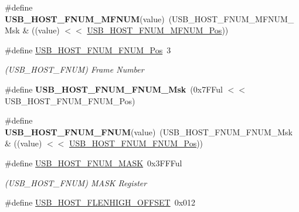 \begin{DoxyCompactItemize}
\item 
\hypertarget{group___s_a_m_l21___u_s_b_ga5c9a91c7aecde239f78f2855b092052f}{}\#define {\bfseries U\+S\+B\+\_\+\+H\+O\+S\+T\+\_\+\+F\+N\+U\+M\+\_\+\+M\+F\+N\+U\+M}(value)~(U\+S\+B\+\_\+\+H\+O\+S\+T\+\_\+\+F\+N\+U\+M\+\_\+\+M\+F\+N\+U\+M\+\_\+\+Msk \& ((value) $<$$<$ \hyperlink{group___s_a_m_l21___u_s_b_ga4f0798badf86adfa80aede8433e5cce4}{U\+S\+B\+\_\+\+H\+O\+S\+T\+\_\+\+F\+N\+U\+M\+\_\+\+M\+F\+N\+U\+M\+\_\+\+Pos}))\label{group___s_a_m_l21___u_s_b_ga5c9a91c7aecde239f78f2855b092052f}

\item 
\hypertarget{group___s_a_m_l21___u_s_b_ga7fccb7a92df0639adc1b73dad6e17d87}{}\#define \hyperlink{group___s_a_m_l21___u_s_b_ga7fccb7a92df0639adc1b73dad6e17d87}{U\+S\+B\+\_\+\+H\+O\+S\+T\+\_\+\+F\+N\+U\+M\+\_\+\+F\+N\+U\+M\+\_\+\+Pos}~3\label{group___s_a_m_l21___u_s_b_ga7fccb7a92df0639adc1b73dad6e17d87}

\begin{DoxyCompactList}\small\item\em (U\+S\+B\+\_\+\+H\+O\+S\+T\+\_\+\+F\+N\+U\+M) Frame Number \end{DoxyCompactList}\item 
\hypertarget{group___s_a_m_l21___u_s_b_gaeba1cea267102daedd3d1d3ca046230a}{}\#define {\bfseries U\+S\+B\+\_\+\+H\+O\+S\+T\+\_\+\+F\+N\+U\+M\+\_\+\+F\+N\+U\+M\+\_\+\+Msk}~(0x7\+F\+Ful $<$$<$ U\+S\+B\+\_\+\+H\+O\+S\+T\+\_\+\+F\+N\+U\+M\+\_\+\+F\+N\+U\+M\+\_\+\+Pos)\label{group___s_a_m_l21___u_s_b_gaeba1cea267102daedd3d1d3ca046230a}

\item 
\hypertarget{group___s_a_m_l21___u_s_b_gafa327196ffc23c58fc29f14560694af5}{}\#define {\bfseries U\+S\+B\+\_\+\+H\+O\+S\+T\+\_\+\+F\+N\+U\+M\+\_\+\+F\+N\+U\+M}(value)~(U\+S\+B\+\_\+\+H\+O\+S\+T\+\_\+\+F\+N\+U\+M\+\_\+\+F\+N\+U\+M\+\_\+\+Msk \& ((value) $<$$<$ \hyperlink{group___s_a_m_l21___u_s_b_ga7fccb7a92df0639adc1b73dad6e17d87}{U\+S\+B\+\_\+\+H\+O\+S\+T\+\_\+\+F\+N\+U\+M\+\_\+\+F\+N\+U\+M\+\_\+\+Pos}))\label{group___s_a_m_l21___u_s_b_gafa327196ffc23c58fc29f14560694af5}

\item 
\hypertarget{group___s_a_m_l21___u_s_b_ga21af3c4840f782641946d6b7e37607a4}{}\#define \hyperlink{group___s_a_m_l21___u_s_b_ga21af3c4840f782641946d6b7e37607a4}{U\+S\+B\+\_\+\+H\+O\+S\+T\+\_\+\+F\+N\+U\+M\+\_\+\+M\+A\+S\+K}~0x3\+F\+F\+Ful\label{group___s_a_m_l21___u_s_b_ga21af3c4840f782641946d6b7e37607a4}

\begin{DoxyCompactList}\small\item\em (U\+S\+B\+\_\+\+H\+O\+S\+T\+\_\+\+F\+N\+U\+M) M\+A\+S\+K Register \end{DoxyCompactList}\item 
\hypertarget{group___s_a_m_l21___u_s_b_ga916daa05b26624912cd972ae9563eef0}{}\#define \hyperlink{group___s_a_m_l21___u_s_b_ga916daa05b26624912cd972ae9563eef0}{U\+S\+B\+\_\+\+H\+O\+S\+T\+\_\+\+F\+L\+E\+N\+H\+I\+G\+H\+\_\+\+O\+F\+F\+S\+E\+T}~0x012\label{group___s_a_m_l21___u_s_b_ga916daa05b26624912cd972ae9563eef0}


\end{DoxyCompactItemize}
